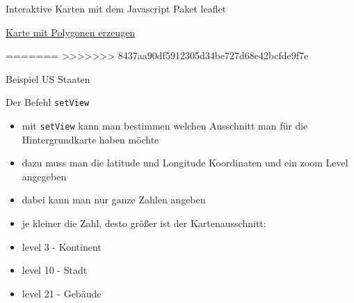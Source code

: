 \documentclass[ignorenonframetext,]{beamer}
\newenvironment{Shaded}{}{}
\newcommand{\KeywordTok}[1]{\textcolor[rgb]{0.00,0.44,0.13}{\textbf{{#1}}}}
\newcommand{\DataTypeTok}[1]{\textcolor[rgb]{0.56,0.13,0.00}{{#1}}}
\newcommand{\DecValTok}[1]{\textcolor[rgb]{0.25,0.63,0.44}{{#1}}}
\newcommand{\StringTok}[1]{\textcolor[rgb]{0.25,0.44,0.63}{{#1}}}
\newcommand{\OtherTok}[1]{\textcolor[rgb]{0.00,0.44,0.13}{{#1}}}
\newcommand{\NormalTok}[1]{{#1}}
\begin{document}
\begin{frame}[fragile]{Interaktive Karten mit dem Javascript Paket
leaflet}
\begin{block}{\href{https://rstudio.github.io/leaflet/map_widget.html}{Karte
mit Polygonen erzeugen}}
\begin{Shaded}
\end{Shaded}

=======
\textgreater{}\textgreater{}\textgreater{}\textgreater{}\textgreater{}\textgreater{}\textgreater{}
8437aa90df5912305d34be727d68e42bcfde9f7e

\end{block}

\begin{block}{Beispiel US Staaten}

\begin{Shaded}
\end{Shaded}

\end{block}

\begin{block}{Der Befehl \texttt{setView}}

\begin{itemize}
\item
  mit \texttt{setView} kann man bestimmen welchen Ausschnitt man für die
  Hintergrundkarte haben möchte
\item
  dazu muss man die latitude und Longitude Koordinaten und ein zoom
  Level angegeben
\item
  dabei kann man nur ganze Zahlen angeben
\item
  je kleiner die Zahl, desto größer ist der Kartenausschnitt:
\item
  level 3 - Kontinent
\item
  level 10 - Stadt
\item
  level 21 - Gebäude
\end{itemize}


\end{block}
\end{frame}
\end{document}

